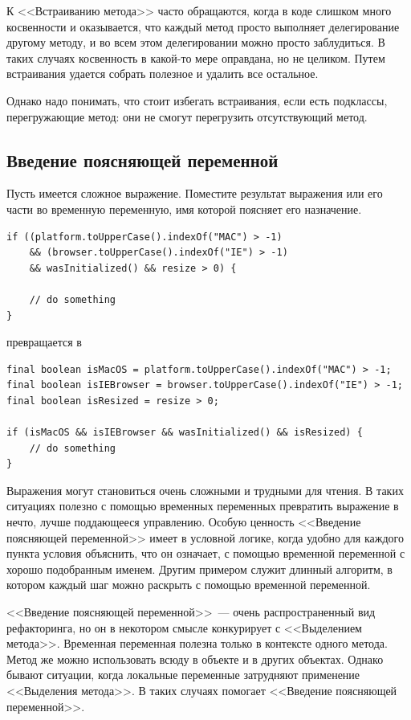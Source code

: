 \documentclass{../../text-style}
\begin{document}
К <<Встраиванию метода>> часто обращаются, когда в коде слишком много косвенности и оказывается, что каждый метод просто выполняет делегирование другому методу, и во всем этом делегировании можно просто заблудиться. В таких случаях косвенность в какой-то мере оправдана, но не целиком. Путем встраивания удается собрать полезное и удалить все остальное.

Однако надо понимать, что стоит избегать встраивания, если есть подклассы, перегружающие метод: они не смогут перегрузить отсутствующий метод.

\subsection{Введение поясняющей переменной}

Пусть имеется сложное выражение. Поместите результат выражения или его части во временную переменную, имя которой поясняет его назначение.

\begin{verbatim}
if ((platform.toUpperCase().indexOf("MAC") > -1)
    && (browser.toUpperCase().indexOf("IE") > -1)
    && wasInitialized() && resize > 0) {

    // do something
}
\end{verbatim}

превращается в 

\begin{verbatim}
final boolean isMacOS = platform.toUpperCase().indexOf("MAC") > -1;
final boolean isIEBrowser = browser.toUpperCase().indexOf("IE") > -1;
final boolean isResized = resize > 0;

if (isMacOS && isIEBrowser && wasInitialized() && isResized) {
    // do something
}
\end{verbatim}

Выражения могут становиться очень сложными и трудными для чтения. В таких ситуациях полезно с помощью временных переменных превратить выражение в нечто, лучше поддающееся управлению. Особую ценность <<Введение поясняющей переменной>> имеет в условной логике, когда удобно для каждого пункта условия объяснить, что он означает, с помощью временной переменной с хорошо подобранным именем. Другим примером служит длинный алгоритм, в котором каждый шаг можно раскрыть с помощью временной переменной.

<<Введение поясняющей переменной>>~--- очень распространенный вид рефакторинга, но он в некотором смысле конкурирует с <<Выделением метода>>. Временная переменная полезна только в контексте одного метода. Метод же можно использовать всюду в объекте и в других объектах. Однако бывают ситуации, когда локальные переменные затрудняют применение <<Выделения метода>>. В таких случаях помогает <<Введение поясняющей переменной>>.
\end{document}
